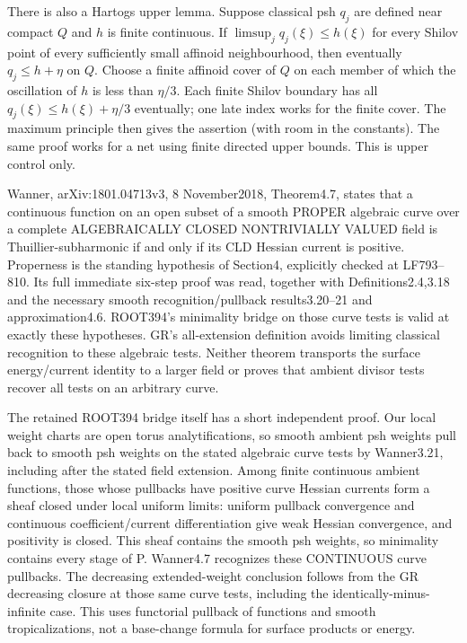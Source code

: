 \documentclass[11pt]{article}
\begin{document}
There is also a Hartogs upper lemma. Suppose classical psh $q_j$ are defined near compact $Q$ and $h$ is finite continuous. If $\limsup_jq_j(\xi)\leq h(\xi)$ for every Shilov point of every sufficiently small affinoid neighbourhood, then eventually $q_j\leq h+\eta$ on $Q$. Choose a finite affinoid cover of $Q$ on each member of which the oscillation of $h$ is less than $\eta/3$. Each finite Shilov boundary has all $q_j(\xi)\leq h(\xi)+\eta/3$ eventually; one late index works for the finite cover. The maximum principle then gives the assertion (with room in the constants). The same proof works for a net using finite directed upper bounds. This is upper control only.

Wanner, arXiv:1801.04713v3, 8 November2018, Theorem4.7, states that a continuous function on an open subset of a smooth PROPER algebraic curve over a complete ALGEBRAICALLY CLOSED NONTRIVIALLY VALUED field is Thuillier-subharmonic if and only if its CLD Hessian current is positive. Properness is the standing hypothesis of Section4, explicitly checked at LF793--810. Its full immediate six-step proof was read, together with Definitions2.4,3.18 and the necessary smooth recognition/pullback results3.20--21 and approximation4.6. ROOT394's minimality bridge on those curve tests is valid at exactly these hypotheses. GR's all-extension definition avoids limiting classical recognition to these algebraic tests. Neither theorem transports the surface energy/current identity to a larger field or proves that ambient divisor tests recover all tests on an arbitrary curve.

The retained ROOT394 bridge itself has a short independent proof. Our local weight charts are open torus analytifications, so smooth ambient psh weights pull back to smooth psh weights on the stated algebraic curve tests by Wanner3.21, including after the stated field extension. Among finite continuous ambient functions, those whose pullbacks have positive curve Hessian currents form a sheaf closed under local uniform limits: uniform pullback convergence and continuous coefficient/current differentiation give weak Hessian convergence, and positivity is closed. This sheaf contains the smooth psh weights, so minimality contains every stage of P. Wanner4.7 recognizes these CONTINUOUS curve pullbacks. The decreasing extended-weight conclusion follows from the GR decreasing closure at those same curve tests, including the identically-minus-infinite case. This uses functorial pullback of functions and smooth tropicalizations, not a base-change formula for surface products or energy.
\end{document}
